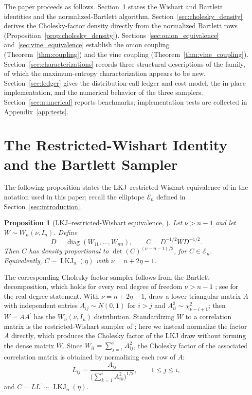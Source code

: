 \documentclass[12pt,english]{article}
\theoremstyle{plain} %
\newtheorem{proposition}{Proposition}
\theoremstyle{definition} %
\theoremstyle{remark} %
\newcommand{\testslocation}{Appendix~\ref{app:tests}}
\newcommand{\testslocation}{the supplementary material}
\begin{document}
The paper proceeds as follows. Section~\ref{sec:identity} states the Wishart and Bartlett identities and the normalized-Bartlett algorithm. Section~\ref{sec:cholesky_density} derives the Cholesky-factor density directly from the normalized Bartlett rows (Proposition~\ref{prop:cholesky_density}). Sections~\ref{sec:onion_equivalence} and~\ref{sec:vine_equivalence} establish the onion coupling (Theorem~\ref{thm:coupling}) and the vine coupling (Theorem~\ref{thm:vine_coupling}). Section~\ref{sec:characterizations} records three structural descriptions of the family, of which the maximum-entropy characterization appears to be new. Section~\ref{sec:ledger} gives the distribution-call ledger and cost model, the in-place implementation, and the numerical behavior of the three samplers. Section~\ref{sec:numerical} reports benchmarks; implementation tests are collected in \testslocation.

\section{The Restricted-Wishart Identity and the Bartlett Sampler}
\label{sec:identity}

The following proposition states the LKJ--restricted-Wishart equivalence of \citet{WangWuChu:2018} in the notation used in this paper; recall the elliptope $\mathcal{E}_n$ defined in Section~\ref{sec:introduction}.

\begin{proposition}[LKJ--restricted-Wishart equivalence, \citealp{WangWuChu:2018}]
\label{prop:lkj_wishart}
Let $\nu>n-1$ and let $W\sim W_n(\nu,I_n)$. Define
$$
D=\operatorname{diag}(W_{11},\ldots,W_{nn}),\qquad
C=D^{-1/2}WD^{-1/2}.
$$
Then $C$ has density proportional to
$\det(C)^{(\nu-n-1)/2}$, for $C\in\mathcal{E}_n$. Equivalently, $C\sim\operatorname{LKJ}_n(\eta)$ with
$\nu=n+2\eta-1$.
\end{proposition}

The corresponding Cholesky-factor sampler follows from the Bartlett decomposition, which holds for every real degree of freedom $\nu>n-1$ \citep{Bartlett:1939}; see \citet[Theorem~3.2.14]{Muirhead:1982} for the real-degree statement. With $\nu=n+2\eta-1$, draw a lower-triangular matrix $A$ with independent entries $A_{ij}\sim N(0,1)$ for $i>j$ and $A_{ii}^2\sim\chi^2_{\nu-i+1}$; then $W=AA^\prime$ has the $W_n(\nu,I_n)$ distribution. Standardizing $W$ to a correlation matrix is the restricted-Wishart sampler of \citet{WangWuChu:2018}; here we instead normalize the factor $A$ directly, which produces the Cholesky factor of the LKJ draw without forming the dense matrix $W$. Since $W_{ii}=\sum_{j=1}^i A_{ij}^2$, the Cholesky factor of the associated correlation matrix is obtained by normalizing each row of $A$:
$$
L_{ij}=\frac{A_{ij}}{\bigl(\sum_{k=1}^i A_{ik}^2\bigr)^{1/2}},\qquad 1\leq j\leq i,
$$
and $C=LL^\prime\sim\operatorname{LKJ}_n(\eta)$.
\end{document}
